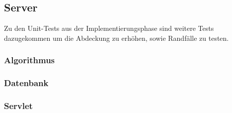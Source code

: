 \documentclass{scrartcl}
\begin{document}
\subsection{Server}
Zu den Unit-Tests aus der Implementierungsphase sind weitere Tests dazugekommen um die Abdeckung zu erhöhen, sowie Randfälle zu testen.
\subsubsection{Algorithmus}
\subsubsection{Datenbank}
\subsubsection{Servlet}
\end{document}
